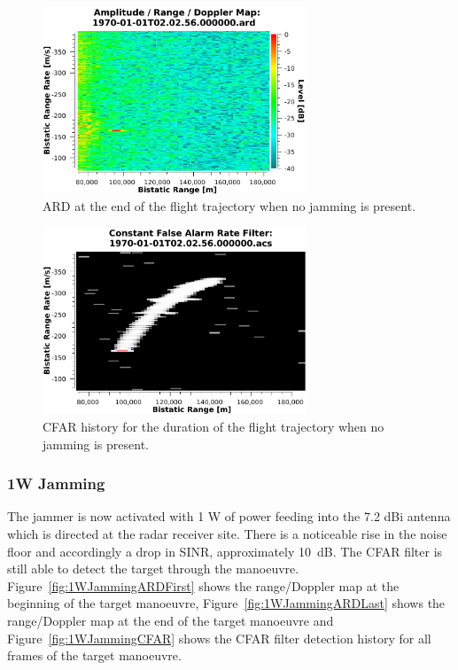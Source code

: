 \documentclass[english, 12pt]{report}
\begin{document}
\begin{figure}[htbp]
\begin{center}
\includegraphics[width=0.7\textwidth]{figs/Simulations/NoJammingARDLast.pdf}
\caption{ARD at the end of the flight trajectory when no jamming is present.}
\label{fig:NoJammingARDLast}
\end{center}
\end{figure}

\begin{figure}[htbp]
\begin{center}
\includegraphics[width=0.7\textwidth]{figs/Simulations/NoJammingCFAR.pdf}
\caption{CFAR history for the duration of the flight trajectory when no jamming is present.}
\label{fig:NoJammingARDCFAR}
\end{center}
\end{figure}

\clearpage

\subsubsection{1W Jamming}
The jammer is now activated with 1 W of power feeding into the 7.2 dBi antenna which is directed at the radar receiver site. There is a noticeable rise in the noise floor and accordingly a drop in SINR, approximately 10~dB. The CFAR filter is still able to detect the target through the manoeuvre. Figure~\ref{fig:1WJammingARDFirst} shows the range/Doppler map at the beginning of the target manoeuvre, Figure~\ref{fig:1WJammingARDLast} shows the range/Doppler map at the end of the target manoeuvre and Figure~\ref{fig:1WJammingCFAR} shows the CFAR filter detection history for all frames of the target manoeuvre.
\end{document}
